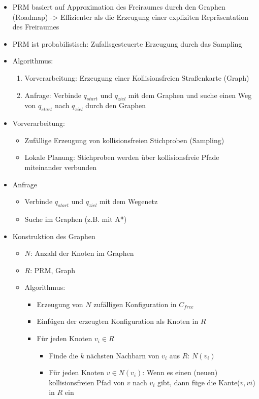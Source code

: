\documentclass[paper=a4, fontsize=11pt]{scrartcl} %
\numberwithin{equation}{section} %
\numberwithin{figure}{section} %
\numberwithin{table}{section} %
\begin{document}
\begin{itemize}
\item PRM basiert auf Approximation des Freiraumes durch den Graphen (Roadmap) -> Effizienter als die Erzeugung einer expliziten Repräsentation des Freiraumes
\item PRM ist probabilistisch: Zufallsgesteuerte Erzeugung durch das Sampling
\item Algorithmus:
\begin{enumerate}
\item Vorverarbeitung: Erzeugung einer Kollisionsfreien Straßenkarte (Graph)
\item Anfrage: Verbinde $q_{start}$ und $q_{ziel}$ mit dem Graphen und suche einen Weg von $q_{start}$ nach $q_{ziel}$ durch den Graphen
\end{enumerate}
\item Vorverarbeitung:
\begin{itemize}
\item Zufällige Erzeugung von kollisionsfreien Stichproben (Sampling)
\item Lokale Planung: Stichproben werden über kollisionsfreie Pfade miteinander verbunden
\end{itemize}
\item Anfrage
\begin{itemize}
\item Verbinde $q_{start}$ und $q_{ziel}$ mit dem Wegenetz
\item Suche im Graphen (z.B. mit A*)
\end{itemize}
\item Konstruktion des Graphen
\begin{itemize}
\item $N$: Anzahl der Knoten im Graphen
\item $R$: PRM, Graph
\item Algorithmus:
\begin{itemize}
\item Erzeugung von $N$ zufälligen Konfiguration in $C_{free}$
\item Einfügen der erzeugten Konfiguration als Knoten in $R$
\item Für jeden Knoten $v_i \in R$
\begin{itemize}
\item Finde die $k$ nächsten Nachbarn von $v_i$ aus $R$: $N(v_i)$
\item Für jeden Knoten $v \in N(v_i)$: Wenn es einen (neuen) kollisionsfreien Pfad von $v$ nach $v_i$ gibt, dann füge die Kante($v,vi$) in $R$ ein

\end{itemize}
\end{itemize}
\end{itemize}
\end{itemize}
\end{document}
